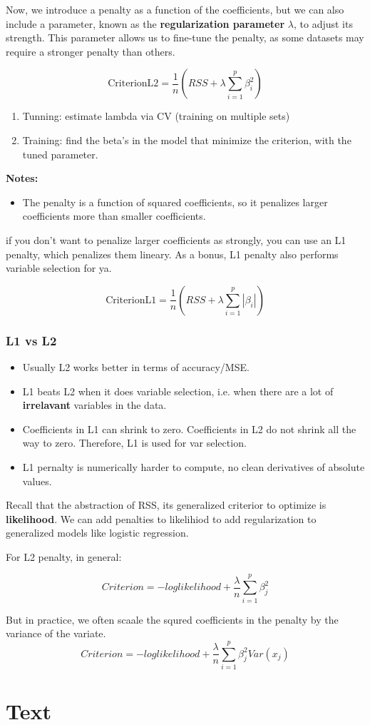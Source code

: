 \documentclass{article}
\begin{document}
Now, we introduce a penalty as a function of the coefficients, but we can also include a parameter, known as the \textbf{regularization parameter} $\lambda$, to adjust its strength. This parameter allows us to fine-tune the penalty, as some datasets may require a stronger penalty than others.

\[ \text{CriterionL2} = 
\frac{1}{n}
( RSS +  \lambda \sum_{i=1}^p \beta_i^2 )
\]

\begin{enumerate}
\item Tunning: estimate lambda via CV (training on multiple sets)
\item Training: find the beta's in the model that minimize the criterion, with the tuned parameter.
\end{enumerate}

\textbf{Notes:}
\begin{itemize}
\item The penalty is a function of squared coefficients, so it penalizes larger coefficients more than smaller coefficients. 
\end{itemize}

if you don't want to penalize larger coefficients as strongly, you can use an L1 penalty, which penalizes them lineary. As a bonus, L1 penalty also performs variable selection for ya. 

\[ \text{CriterionL1} = 
\frac{1}{n}
( RSS +  \lambda \sum_{i=1}^p |\beta_i| )
\]

\subsubsection{L1 vs L2}
\begin{itemize}
\item Usually L2 works better in terms of accuracy/MSE.
\item L1 beats L2 when it does variable selection, i.e. when there are a lot of \textbf{irrelavant} variables in the data. 
\item Coefficients in L1 can shrink to zero. Coefficients in L2 do not shrink all the way to zero. Therefore, L1 is used for var selection.
\item L1 pernalty is numerically harder to compute, no clean derivatives of absolute values. 
\end{itemize}

Recall that the abstraction of RSS, its generalized  criterior to optimize is \textbf{likelihood}. We can add penalties to likelihiod to add regularization to generalized models like logistic regression.

For L2 penalty, in general:

\[Criterion =  -loglikelihood + \frac{\lambda}{n} \sum_{i=1}^p \beta_j^2\]

But in practice, we often scaale the squred coefficients in the penalty by the variance of the variate. 
\[Criterion =  -loglikelihood + \frac{\lambda}{n} \sum_{i=1}^p \beta_j^2 Var(x_j)\]


\section{Text}
\end{document}
